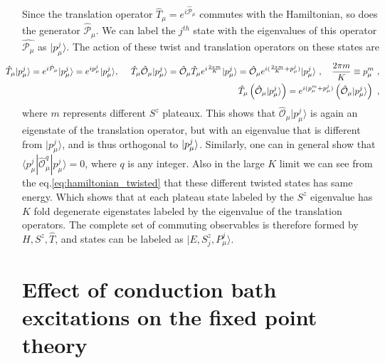 \documentclass[10pt]{iopart}
\begin{document}
Since the translation operator $\hat{T}_{\mu}=e^{i\hat{\mathcal{P}}_{\mu}}$ commutes with the Hamiltonian, so does the generator $\hat{\mathcal{P}}_{\mu}$. We can label the $j^{th}$ state with the eigenvalues of this operator $\hat{\mathcal{P}_{\mu}}$ as $|p^{j}_{\mu}\rangle$. The action of these twist and translation operators on these states are
\begin{eqnarray}
\hspace*{-20pt}\hat{T}_{\mu} |p^j_{\mu} \rangle = e^{i\hat{\mathcal{P}}_{\mu}} |p^j_{\mu} \rangle = e^{ip^j_{\mu}} |p^j_{\mu}\rangle, ~ ~ ~ ~ \hat{T}_{\mu} \hat{\mathcal{O}}_{\mu} |p^j_{\mu} \rangle =  \hat{\mathcal{O}}_{\mu} \hat{T}_{\mu} e^{i\frac{2\pi m}{K}} |p^j_{\mu}\rangle = \hat{\mathcal{O}}_{\mu}   e^{i(\frac{2\pi m}{K}+p_{\mu}^j)} |p^j_{\mu}\rangle~,\quad\frac{2\pi m}{K} \equiv p_{\mu}^{m}~, \nonumber\\
\hspace*{-20pt}\hat{T}_{\mu} \left( \hat{\mathcal{O}}_{\mu} |p^j_{\mu} \rangle  \right) = e^{i(p_{\mu}^{m}+p_{\mu}^j)} \left( \hat{\mathcal{O}}_{\mu}    |p^j_{\mu}\rangle \right)~,
\end{eqnarray}
where $m$ represents different $S^z$ plateaux. This shows that  $\hat{\mathcal{O}}_{\mu} |p^j_{\mu} \rangle $ is again an eigenstate of the translation operator, but with an eigenvalue that is different from $|p^j_{\mu} \rangle $, and is thus orthogonal to $\ket{p^j_{\mu}}$. Similarly, one can in general show that $\langle p^j_{\mu} | \hat{\mathcal{O}}^{q}_{\mu} |p^j_{\mu} \rangle=0$, where $q$ is any integer. Also in the large $K$ limit we can see from the eq.\eqref{eq:hamiltonian_twisted} that these different twisted states has same energy. Which shows that at each plateau state labeled by the $S^z$ eigenvalue has $K$ fold degenerate eigenstates labeled by the eigenvalue of the translation operators. The complete set of commuting observables is therefore formed by $H,S^z,\hat{T}$, and states can be labeled as  $|E,S^z_j,P^j_{\mu}\rangle$. 




\section{Effect of conduction bath excitations on the fixed point theory}
\end{document}
